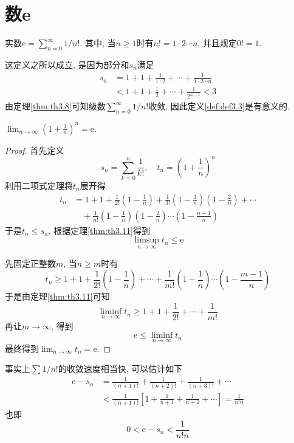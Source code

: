 \documentclass[cn,12pt,math=mtpro2,citestyle=gb7714-2015,bibstyle=gb7714-2015,twocol]{elegantbook}
\newcommand{\limn }{\lim_{n\to\infty}}
\begin{document}
\section{数e}
\begin{definition}\label{def:def3.3}
实数$ \text{e}=\sum_{n=0}^{\infty}1/{n!}$. 其中, 当$n\geq 1$时有$n!=1\cdot2\cdots n$, 并且规定$0!=1$.
\end{definition}
这定义之所以成立, 是因为部分和$s_n$满足
\begin{align*}
s_n&=1+1+\frac{1}{1\cdot2}+\cdots+\frac{1}{1\cdot2\cdots n} \\
&<1+1+\frac{1}{2}+\cdots+\frac{1}{2^{n-1}}<3
\end{align*}
由定理\ref{thm:th3.8}可知级数$\sum_{n=0}^{\infty}1/{n!}$收敛, 因此定义\ref{def:def3.3}是有意义的.
\begin{theorem}\label{thm:th3.18}
  $\displaystyle\limn \left(1+\frac{1}{n}\right)^n=\text{e}$.
\end{theorem}
\begin{proof}
  首先定义
  $$ s_n=\sum_{k=0}^{n}\frac{1}{k!},\quad t_n=\left(1+\frac{1}{n}\right)^n$$
  利用二项式定理将$t_n$展开得
  \begin{align*}
  t_n&=1+1+\frac{1}{2!}\left(1-\frac{1}{n}\right)+\frac{1}{3!}\left(1-\frac{1}{n}\right)\left(1-\frac{2}{n}\right)+\cdots \\
  &\quad +\frac{1}{n!}\left(1-\frac{1}{n}\right)\left(1-\frac{2}{n}\right)\cdots\left(1-\frac{n-1}{n}\right)
  \end{align*}
  于是$t_n\leq s_n$. 根据定理\ref{thm:th3.11}得到$$\displaystyle\limsup_{n\to\infty} t_n\leq \text{e}$$

  先固定正整数$m$, 当$n\geq m$时有
  $$t_n\geq1+1+\frac{1}{2!}\left(1-\frac{1}{n}\right)+\cdots+\frac{1}{m!}\left(1-\frac{1}{n}\right)\cdots\left(1-\frac{m-1}{n}\right)$$
  于是由定理\ref{thm:th3.11}可知
  $$\displaystyle\liminf_{n\to\infty} t_n\geq 1+1+\frac{1}{2!}+\cdots+\frac{1}{m!}$$
  再让$m\rightarrow\infty$, 得到
  $$\displaystyle\text{e}\leq \liminf_{n\to\infty} t_n$$
  最终得到$\limn t_n=\text{e}$.
\end{proof}
事实上$\sum1/n!$的收敛速度相当快, 可以估计如下
\begin{align*}
\text{e}-s_n&=\frac{1}{(n+1)!}+\frac{1}{(n+2)!}+\frac{1}{(n+3)!}+\cdots \\
&<\frac{1}{(n+1)!}\left[1+\frac{1}{n+1}+\frac{1}{n+2}+\cdots\right] =\frac{1}{n!n}
\end{align*}
也即
\begin{equation}\label{eq3.6}
0<\text{e}-s_n<\frac{1}{n!n}
\end{equation}
\end{document}
